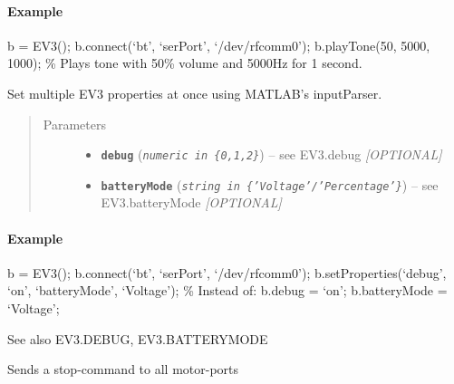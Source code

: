 \documentclass[letterpaper,10pt,english]{sphinxmanual}
\begin{document}
\begin{fulllineitems}
\begin{fulllineitems}
\begin{quote}
\begin{description}
\end{description}\end{quote}
\paragraph{Example}

b = EV3(); 
b.connect(`bt', `serPort', `/dev/rfcomm0'); 
b.playTone(50, 5000, 1000);  \% Plays tone with 50\% volume and 5000Hz for 1
second. 

\end{fulllineitems}


\begin{fulllineitems}
\label{source:source.EV3.setProperties}
Set multiple EV3 properties at once using MATLAB's inputParser.
\begin{quote}\begin{description}
\item[{Parameters}] \leavevmode\begin{itemize}
\item {} 
\textbf{\texttt{debug}} (\emph{\texttt{numeric in \{0,1,2\}}}) -- see EV3.debug \emph{{[}OPTIONAL{]}}

\item {} 
\textbf{\texttt{batteryMode}} (\emph{\texttt{string in \{'Voltage'/'Percentage'\}}}) -- see EV3.batteryMode \emph{{[}OPTIONAL{]}}

\end{itemize}

\end{description}\end{quote}
\paragraph{Example}

b = EV3(); 
b.connect(`bt', `serPort', `/dev/rfcomm0'); 
b.setProperties(`debug', `on', `batteryMode', `Voltage'); 
\% Instead of: b.debug = `on'; b.batteryMode = `Voltage'; 

See also EV3.DEBUG, EV3.BATTERYMODE

\end{fulllineitems}


\begin{fulllineitems}
\label{source:source.EV3.stopAllMotors}
Sends a stop-command to all motor-ports


\end{fulllineitems}
\end{fulllineitems}
\end{document}

